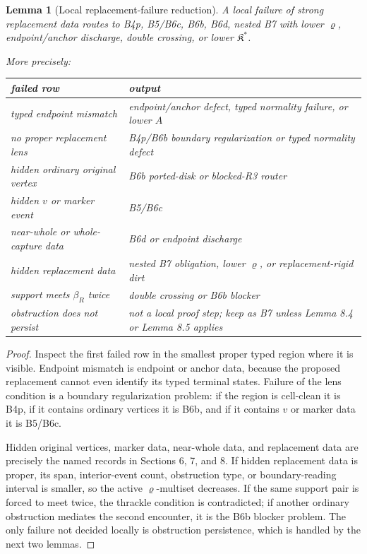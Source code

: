 \documentclass[11pt]{amsart}
\newtheorem{lemma}[theorem]{Lemma}
\theoremstyle{definition}
\begin{document}
\begin{lemma}[Local replacement-failure reduction]
A local failure of strong
replacement data routes to B4p, B5/B6c, B6b, B6d, nested B7 with lower
\(\varrho\), endpoint/anchor discharge, double crossing, or lower
\(\mathfrak K^\ast\).

More precisely:

\begin{center}
\begin{tabular}{p{}p{}}
failed row & output \\ \hline
typed endpoint mismatch & endpoint/anchor defect, typed normality failure, or lower \(A\) \\
no proper replacement lens & B4p/B6b boundary regularization or typed normality defect \\
hidden ordinary original vertex & B6b ported-disk or blocked-R3 router \\
hidden \(v\) or marker event & B5/B6c \\
near-whole or whole-capture data & B6d or endpoint discharge \\
hidden replacement data & nested B7 obligation, lower \(\varrho\), or replacement-rigid dirt \\
support meets \(\beta_R\) twice & double crossing or B6b blocker \\
obstruction does not persist & not a local proof step; keep as B7 unless Lemma 8.4 or Lemma 8.5 applies \\
\end{tabular}
\end{center}

\end{lemma}
\begin{proof}
Inspect the first failed row in the smallest proper typed region where it is visible. Endpoint mismatch is endpoint or anchor data, because the proposed replacement cannot even identify its typed terminal states. Failure of the lens condition is a boundary regularization problem: if the region is cell-clean it is B4p, if it contains ordinary vertices it is B6b, and if it contains \(v\) or marker data it is B5/B6c.

Hidden original vertices, marker data, near-whole data, and replacement data
are precisely the named records in Sections 6, 7, and 8. If hidden replacement
data is proper, its span, interior-event count, obstruction type, or
boundary-reading interval is smaller, so the active \(\varrho\)-multiset
decreases. If the same support pair is forced to meet twice, the thrackle
condition is contradicted; if another ordinary obstruction mediates the second
encounter, it is the B6b blocker problem. The only failure not decided locally
is obstruction persistence, which is handled by the next two lemmas.

\end{proof}
\end{document}
